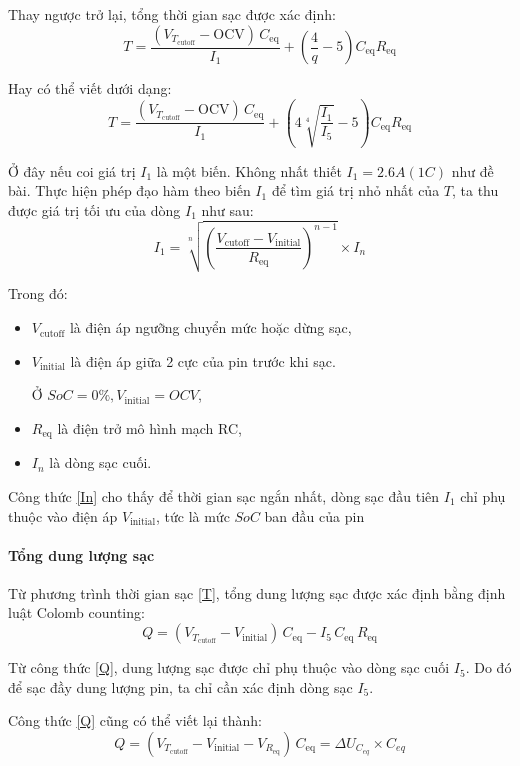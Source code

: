 \documentclass{thesis}
\begin{document}
Thay ngược trở lại, tổng thời gian sạc được xác định: 
\[
T = \frac{(V_{T_{\text{cutoff}}} - \text{OCV}) \, C_{\text{eq}}}{I_1} + \left( \frac{4}{q} - 5 \right) C_{\text{eq}} R_{\text{eq}}
\]

Hay có thể viết dưới dạng:
\[
T = \frac{(V_{T_{\text{cutoff}}} - \text{OCV}) \, C_{\text{eq}}}{I_1} + \left( 4 \sqrt[4]{\frac{I_1}{I_5}} - 5 \right) C_{\text{eq}} R_{\text{eq}}
\]

Ở đây nếu coi giá trị $I_1$ là một biến. Không nhất thiết $I_1=2.6A (1C)$ như đề bài. Thực hiện phép đạo hàm theo biến $I_1$ để tìm giá trị nhỏ nhất của $T$, ta thu được giá trị tối ưu của dòng $I_1$ như sau: 
\begin{equation}
    I_1 = \sqrt[n]{\left( \dfrac{{V_{\text{cutoff}} - V_{\text{initial}}}}{R_{\text{eq}}} \right)^{n-1}} \times I_n
    \label{In}
\end{equation}

Trong đó:
\begin{itemize}
  \item \( V_{\text{cutoff}} \) là điện áp ngưỡng chuyển mức hoặc dừng sạc,
  \item \( V_{\text{initial}} \) là điện áp giữa 2 cực của pin trước khi sạc.
  
  Ở $SoC=0\%, V_{\text{initial}}=OCV$, 
  \item \( R_{\text{eq}} \) là điện trở mô hình mạch RC,
  \item \( I_n \) là dòng sạc cuối.
\end{itemize}
Công thức \ref{In} cho thấy để thời gian sạc ngắn nhất, dòng sạc đầu tiên $I_1$ chỉ phụ thuộc vào điện áp $V_{\text{initial}}$, tức là mức $SoC$ ban đầu của pin 


\paragraph{Tổng dung lượng sạc}\mbox


Từ phương trình thời gian sạc \ref{T}, tổng dung lượng sạc được xác định bằng định luật Colomb counting: 
\begin{equation}
    Q = (V_{T_{\text{cutoff}}} - V_{\text{initial}}) \, C_{\text{eq}} - I_5 \, C_{\text{eq}} \, R_{\text{eq}}
    \label{Q}
\end{equation}

Từ công thức \ref{Q}, dung lượng sạc được chỉ phụ thuộc vào dòng sạc cuối $I_5$. Do đó để sạc đầy dung lượng pin, ta chỉ cần xác định dòng sạc $I_5$.

Công thức \ref{Q} cũng có thể viết lại thành: 
\begin{equation}
    Q = (V_{T_{\text{cutoff}}} - V_{\text{initial}} -V_{R_{\text{eq}}}) \, C_{\text{eq}} = \Delta U_{C_{eq}}\times C_{eq}
    \label{Q1}
\end{equation}
\end{document}
